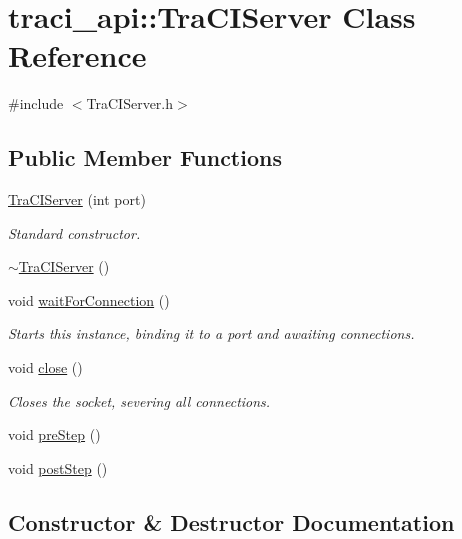 \hypertarget{classtraci__api_1_1_tra_c_i_server}{}\section{traci\+\_\+api\+:\+:Tra\+C\+I\+Server Class Reference}
\label{classtraci__api_1_1_tra_c_i_server}


{\ttfamily \#include $<$Tra\+C\+I\+Server.\+h$>$}

\subsection*{Public Member Functions}
\begin{DoxyCompactItemize}
\item 
\hyperlink{classtraci__api_1_1_tra_c_i_server_a9960233a10a2c3790c375f91eec00b12}{Tra\+C\+I\+Server} (int port)
\begin{DoxyCompactList}\small\item\em Standard constructor. \end{DoxyCompactList}\item 
\hyperlink{classtraci__api_1_1_tra_c_i_server_a8ddc7d9ea6812c937cdaa06a00026eba}{$\sim$\+Tra\+C\+I\+Server} ()
\item 
void \hyperlink{classtraci__api_1_1_tra_c_i_server_ac9cc474ec4ae6277c82cbf80f212852e}{wait\+For\+Connection} ()
\begin{DoxyCompactList}\small\item\em Starts this instance, binding it to a port and awaiting connections. \end{DoxyCompactList}\item 
void \hyperlink{classtraci__api_1_1_tra_c_i_server_a1fd920907cde7ef5a10d078aec34080a}{close} ()
\begin{DoxyCompactList}\small\item\em Closes the socket, severing all connections. \end{DoxyCompactList}\item 
void \hyperlink{classtraci__api_1_1_tra_c_i_server_a8cd79e7da542e4abccc75d4933331d20}{pre\+Step} ()
\item 
void \hyperlink{classtraci__api_1_1_tra_c_i_server_af4814a9a99d79f4e00fc102169d10cc2}{post\+Step} ()
\end{DoxyCompactItemize}


\subsection{Constructor \& Destructor Documentation}
\mbox{\label{classtraci__api_1_1_tra_c_i_server_a9960233a10a2c3790c375f91eec00b12}} 
